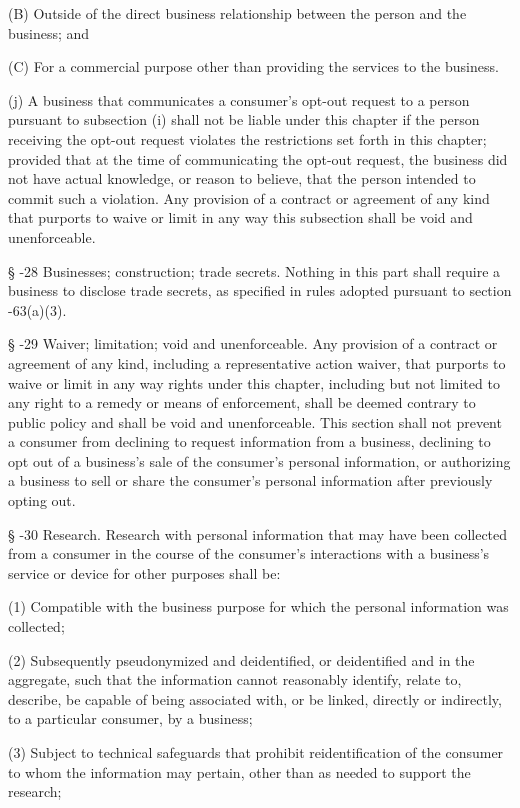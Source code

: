           (B)  Outside of the direct business relationship between the person and the business; and

          (C)  For a commercial purpose other than providing the services to the business.

     (j)  A business that communicates a consumer's opt-out request to a person pursuant to subsection (i) shall not be liable under this chapter if the person receiving the opt-out request violates the restrictions set forth in this chapter; provided that at the time of communicating the opt-out request, the business did not have actual knowledge, or reason to believe, that the person intended to commit such a violation.  Any provision of a contract or agreement of any kind that purports to waive or limit in any way this subsection shall be void and unenforceable.

     §   -28  Businesses; construction; trade secrets.  Nothing in this part shall require a business to disclose trade secrets, as specified in rules adopted pursuant to section    -63(a)(3).

     §   -29  Waiver; limitation; void and unenforceable.  Any provision of a contract or agreement of any kind, including a representative action waiver, that purports to waive or limit in any way rights under this chapter, including but not limited to any right to a remedy or means of enforcement, shall be deemed contrary to public policy and shall be void and unenforceable.  This section shall not prevent a consumer from declining to request information from a business, declining to opt out of a business's sale of the consumer's personal information, or authorizing a business to sell or share the consumer's personal information after previously opting out.

     §   -30  Research.  Research with personal information that may have been collected from a consumer in the course of the consumer's interactions with a business's service or device for other purposes shall be:

     (1)  Compatible with the business purpose for which the personal information was collected;

     (2)  Subsequently pseudonymized and deidentified, or deidentified and in the aggregate, such that the information cannot reasonably identify, relate to, describe, be capable of being associated with, or be linked, directly or indirectly, to a particular consumer, by a business;

     (3)  Subject to technical safeguards that prohibit reidentification of the consumer to whom the information may pertain, other than as needed to support the research;

